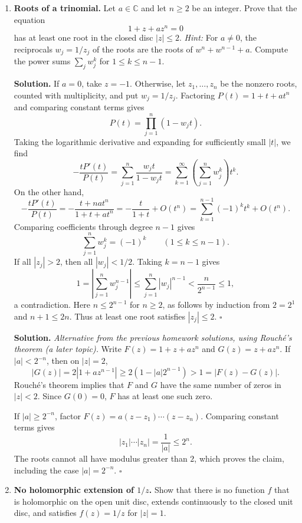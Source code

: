 \documentclass[12pt,reqno]{amsart}
\newcommand{\C}{\mathbb{C}}
\newenvironment{solution}
  {\par\smallskip\begin{tcolorbox}[breakable,enhanced,colback=solblue,colframe=solframe,
   boxrule=0.5pt,arc=2pt,left=6pt,right=6pt,top=4pt,bottom=4pt]\setlength{\abovedisplayskip}{7pt}\setlength{\belowdisplayskip}{7pt}\noindent\textbf{Solution.}}
  {\hfill$\square$\end{tcolorbox}\par\medskip}
\begin{document}
\begin{enumerate}
\item \textbf{Roots of a trinomial.}
Let $a\in\C$ and let $n\geq2$ be an integer. Prove that the equation
\[
 1+z+az^n=0
\]
has at least one root in the closed disc $|z|\leq2$.
\emph{Hint:} For $a\neq0$, the reciprocals $w_j=1/z_j$ of the roots are
the roots of $w^n+w^{n-1}+a$. Compute the power sums
$\sum_j w_j^{k}$ for $1\leq k\leq n-1$.


\begin{solution}
If $a=0$, take $z=-1$. Otherwise, let $z_1,\ldots,z_n$ be the nonzero
roots, counted with multiplicity, and put $w_j=1/z_j$.
Factoring $P(t)=1+t+at^n$ and comparing constant terms gives
\[
P(t)=\prod_{j=1}^n(1-w_jt).
\]
Taking the logarithmic derivative and expanding for sufficiently small
$|t|$, we find
\[
-\frac{tP'(t)}{P(t)}
=\sum_{j=1}^n\frac{w_jt}{1-w_jt}
=\sum_{k=1}^\infty\left(\sum_{j=1}^n w_j^k\right)t^k.
\]
On the other hand,
\[
-\frac{tP'(t)}{P(t)}
=-\frac{t+nat^n}{1+t+at^n}
=-\frac{t}{1+t}+O(t^n)
=\sum_{k=1}^{n-1}(-1)^k t^k+O(t^n).
\]
Comparing coefficients through degree $n-1$ gives
\[
\boxed{\sum_{j=1}^n w_j^k=(-1)^k\qquad(1\leq k\leq n-1).}
\]
If all $|z_j|>2$, then all $|w_j|<1/2$. Taking $k=n-1$ gives
\[
1=\left|\sum_{j=1}^n w_j^{n-1}\right|
\leq\sum_{j=1}^n|w_j|^{n-1}
<\frac{n}{2^{n-1}}\leq1,
\]
a contradiction. Here $n\leq2^{n-1}$ for $n\geq2$, as follows by
induction from $2=2^1$ and $n+1\leq2n$.
Thus at least one root satisfies $|z_j|\leq2$.
\end{solution}

\begin{solution}
\textit{Alternative from the previous homework solutions, using
Rouch\'e's theorem (a later topic).}
Write $F(z)=1+z+az^n$ and $G(z)=z+az^n$.
If $|a|<2^{-n}$, then on $|z|=2$,
\[
|G(z)|=2|1+az^{n-1}|
\geq2(1-|a|2^{n-1})>1=|F(z)-G(z)|.
\]
Rouch\'e's theorem implies that $F$ and $G$ have the same number of
zeros in $|z|<2$. Since $G(0)=0$, $F$ has at least one such zero.

If $|a|\geq2^{-n}$, factor
$F(z)=a(z-z_1)\cdots(z-z_n)$. Comparing constant terms gives
\[
|z_1|\cdots|z_n|=\frac1{|a|}\leq2^n.
\]
The roots cannot all have modulus greater than $2$, which proves the
claim, including the case $|a|=2^{-n}$.
\end{solution}

\item \textbf{No holomorphic extension of $1/z$.}
Show that there is no function $f$ that is holomorphic on the open unit
disc, extends continuously to the closed unit disc, and satisfies
$f(z)=1/z$ for $|z|=1$.



\end{enumerate}
\end{document}
